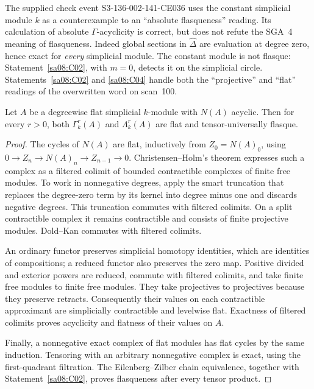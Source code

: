 The supplied check event S3-136-002-141-CE036 uses the constant
simplicial module $k$ as a counterexample to an ``absolute flasqueness''
reading. Its calculation of absolute $\Gamma$-acyclicity is correct,
but does not refute the SGA~4 meaning of flasqueness. Indeed global
sections in $\widehat\Delta$ are evaluation at degree zero, hence
exact for \emph{every} simplicial module. The constant module is not
flasque: Statement~\ref{sa08:C02}, with $m=0$, detects it on the
simplicial circle. Statements~\ref{sa08:C02} and \ref{sa08:C04} handle
both the ``projective'' and ``flat'' readings of the overwritten word
on scan~100.

\begin{theorem}\label{sa08:C05}
Let $A$ be a degreewise flat simplicial $k$-module with $N(A)$ acyclic.
Then for every $r>0$, both $\Gamma_k^r(A)$ and $\Lambda_k^r(A)$ are
flat and tensor-universally flasque.
\end{theorem}
\begin{proof}
The cycles of $N(A)$ are flat, inductively from $Z_0=N(A)_0$, using
$0\to Z_n\to N(A)_n\to Z_{n-1}\to0$. Christensen--Holm's theorem
\cite[Theorem~7.3 in the opened preprint]{christensen-holm}
expresses such a complex as a filtered colimit of bounded
contractible complexes of finite free modules. To work in
nonnegative degrees, apply the smart truncation that replaces the
degree-zero term by its kernel into degree minus one and discards
negative degrees. This truncation commutes with filtered colimits.
On a split contractible complex it remains contractible and consists
of finite projective modules. Dold--Kan commutes with filtered
colimits.

An ordinary functor preserves simplicial homotopy identities, which
are identities of compositions; a reduced functor also preserves
the zero map. Positive divided and exterior powers are reduced,
commute with filtered colimits, and take finite free modules to
finite free modules. They take projectives to projectives because
they preserve retracts. Consequently their values on each
contractible approximant are simplicially contractible and
levelwise flat. Exactness of filtered colimits proves acyclicity
and flatness of their values on $A$.

Finally, a nonnegative exact complex of flat modules has flat cycles
by the same induction. Tensoring with an arbitrary nonnegative
complex is exact, using the first-quadrant filtration. The
Eilenberg--Zilber chain equivalence, together with
Statement~\ref{sa08:C02}, proves flasqueness after every tensor product.
\end{proof}

